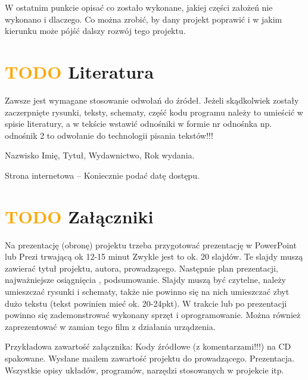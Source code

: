 \documentclass[11pt,titlepage]{article}
\begin{document}
W ostatnim punkcie opisać co zostało wykonane, jakiej części założeń nie wykonano i dlaczego. Co można zrobić, by dany projekt poprawić i w jakim kierunku może pójść dalszy rozwój tego projektu.

\section{\textcolor{orange}{TODO} Literatura}

Zawsze jest wymagane stosowanie odwołań do źródeł. Jeżeli skądkolwiek zostały zaczerpnięte rysunki, teksty, schematy, część kodu programu należy to umieścić w spisie literatury, a w tekście wstawić odnośniki w formie nr odnośnka np. odnośnik 2 to odwołanie do technologii pisania tekstów!!!

Nazwisko Imię, Tytuł, Wydawnictwo, Rok wydania.

Strona internetowa – Koniecznie podać datę dostępu.

\section{\textcolor{orange}{TODO} Załączniki}

Na prezentację (obronę) projektu trzeba przygotować prezentację w PowerPoint lub Prezi trwającą ok 12-15 minut Zwykle jest to ok. 20 slajdów. Te slajdy muszą zawierać tytuł projektu, autora, prowadzącego. Następnie plan prezentacji, najważniejsze osiągnięcia , podsumowanie. Slajdy muszą być czytelne, należy umieszczać rysunki i schematy, także nie powinno się na nich umieszczać zbyt dużo tekstu (tekst powinien mieć ok. 20-24pkt). W trakcie lub po prezentacji powinno się zademonstrować wykonany sprzęt i oprogramowanie. Można również zaprezentować w zamian tego film z działania urządzenia.

Przykładowa zawartość załącznika:
Kody źródłowe (z komentarzami!!!) na CD spakowane.
Wysłane mailem zawartość projektu do prowadzącego.
Prezentacja.
Wszystkie opisy układów, programów, narzędzi stosowanych w projekcie itp.
\end{document}
